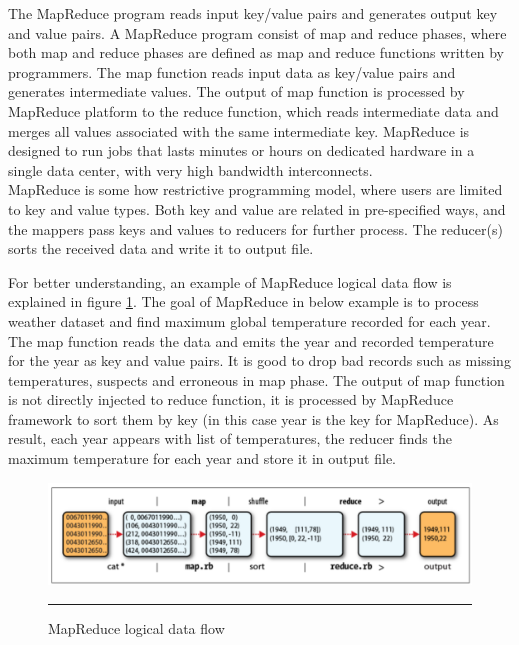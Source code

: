  The MapReduce program reads input key/value pairs and generates output key and value pairs. A MapReduce program consist of map and reduce phases, where both map and reduce phases are defined as map and reduce functions written by programmers. The map function reads input data as  key/value pairs and generates intermediate values. The output of map function is processed by MapReduce platform to the reduce function, which reads intermediate data and merges all values associated with the same intermediate key. MapReduce is designed to run jobs that lasts minutes or hours on dedicated hardware in a single data center, with very high bandwidth interconnects.\cite{tom3}\\

 MapReduce is some how restrictive programming model, where users are limited to key and value types. Both key and value are related in pre-specified ways, and the mappers pass keys and values to reducers for further process. The reducer(s) sorts the received data and write it to output file.      

For better understanding, an example of MapReduce logical data flow is explained in figure \ref{fig:map-reduce}. The goal of MapReduce in below example is to process weather dataset and find maximum global temperature recorded for each year. The map function reads the data and emits the year and recorded temperature for the year as key and value pairs. It is good to drop bad records such as missing temperatures, suspects and erroneous in map phase. The output of map function is not directly injected to reduce function, it is processed by MapReduce framework to sort them by key (in this case year is the key for MapReduce). As result, each year appears with list of temperatures, the reducer finds the maximum temperature for each year and store it in output file.  
  
\begin{figure}[htbp]
  \centering
    \includegraphics[width=\textwidth,height=\textheight,keepaspectratio]{./Figures/map-reduce.pdf}
    \rule{35em}{0.5pt}
  \caption{MapReduce logical data flow \cite{tom3}}
  \label{fig:map-reduce}
\end{figure}


